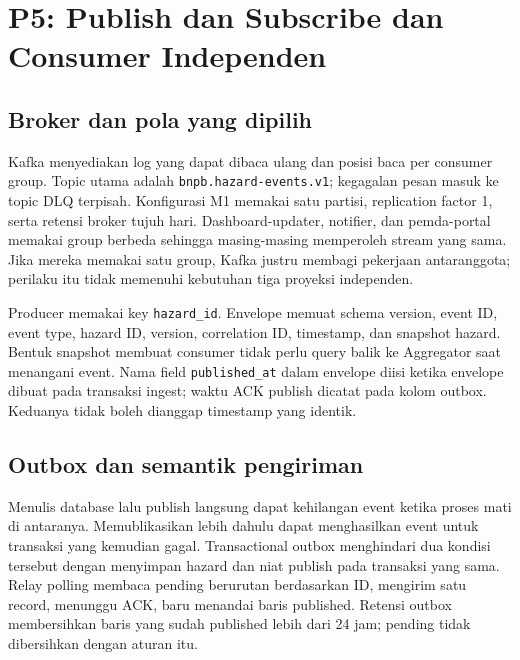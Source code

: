 \section{P5: Publish dan Subscribe dan Consumer Independen}
\label{sec:p5}
\subsection{Broker dan pola yang dipilih}
Kafka menyediakan log yang dapat dibaca ulang dan posisi baca per consumer group. Topic utama adalah \texttt{bnpb.hazard-events.v1}; kegagalan pesan masuk ke topic DLQ terpisah. Konfigurasi M1 memakai satu partisi, replication factor 1, serta retensi broker tujuh hari. Dashboard-updater, notifier, dan pemda-portal memakai group berbeda sehingga masing-masing memperoleh stream yang sama. Jika mereka memakai satu group, Kafka justru membagi pekerjaan antaranggota; perilaku itu tidak memenuhi kebutuhan tiga proyeksi independen.

Producer memakai key \texttt{hazard\_id}. Envelope memuat schema version, event ID, event type, hazard ID, version, correlation ID, timestamp, dan snapshot hazard. Bentuk snapshot membuat consumer tidak perlu query balik ke Aggregator saat menangani event. Nama field \texttt{published\_at} dalam envelope diisi ketika envelope dibuat pada transaksi ingest; waktu ACK publish dicatat pada kolom outbox. Keduanya tidak boleh dianggap timestamp yang identik.

\subsection{Outbox dan semantik pengiriman}

Menulis database lalu publish langsung dapat kehilangan event ketika proses mati di antaranya. Memublikasikan lebih dahulu dapat menghasilkan event untuk transaksi yang kemudian gagal. Transactional outbox menghindari dua kondisi tersebut dengan menyimpan hazard dan niat publish pada transaksi yang sama. Relay polling membaca pending berurutan berdasarkan ID, mengirim satu record, menunggu ACK, baru menandai baris published. Retensi outbox membersihkan baris yang sudah published lebih dari 24 jam; pending tidak dibersihkan dengan aturan itu.

